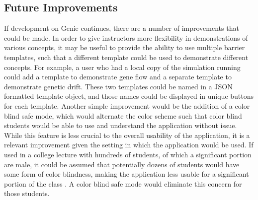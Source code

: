 \documentclass[12pt]{article}
\begin{document}
\begin{spacing}{1.6}
\subsection{Future Improvements}
If development on Genie continues, there are a number of improvements that could be made. In order to give instructors more flexibility in demonstrations of various concepts, it may be useful to provide the ability to use multiple barrier templates, such that a different template could be used to demonstrate different concepts. For example, a user who had a local copy of the simulation running could add a template to demonstrate gene flow and a separate template to demonstrate genetic drift. These two templates could be named in a JSON formatted template object, and those names could be displayed in unique buttons for each template.\newline
\newline
Another simple improvement would be the addition of a color blind safe mode, which would alternate the color scheme such that color blind students would be able to use and understand the application without issue. While this feature is less crucial to the overall usability of the application, it is a relevant improvement given the setting in which the application would be used. If used in a college lecture with hundreds of students, of which a significant portion are male, it could be assumed that potentially dozens of students would have some form of color blindness, making the application less usable for a significant portion of the class \cite{colorblind}. A color blind safe mode would eliminate this concern for those students.


\end{spacing}
\end{document}
